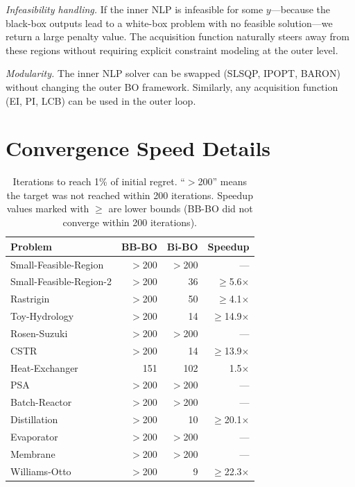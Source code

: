 \documentclass[12pt,a4paper]{article}%
\theoremstyle{plain}%
\theoremstyle{remark}%
\theoremstyle{definition}%
\begin{document}
\begin{appendices}
\emph{Infeasibility handling.} If the inner NLP is infeasible for some $y$---because the black-box outputs lead to a white-box problem with no feasible solution---we return a large penalty value. The acquisition function naturally steers away from these regions without requiring explicit constraint modeling at the outer level.

\emph{Modularity.} The inner NLP solver can be swapped (SLSQP, IPOPT, BARON) without changing the outer BO framework. Similarly, any acquisition function (EI, PI, LCB) can be used in the outer loop.

\section{Convergence Speed Details}\label{sec:convergence_speed_details}

\begin{table}[htbp]
\centering
\caption{Iterations to reach 1\% of initial regret. ``$>$200'' means the target was not reached within 200 iterations. Speedup values marked with $\geq$ are lower bounds (BB-BO did not converge within 200 iterations).}
\label{tab:convergence_speed}
\begin{tabular}{@{}lrrr@{}}
\toprule
\textbf{Problem} & \textbf{BB-BO} & \textbf{Bi-BO} & \textbf{Speedup} \\
\midrule
Small-Feasible-Region   & $>$200 & $>$200 & ---       \\
Small-Feasible-Region-2 & $>$200 & 36     & $\geq$5.6$\times$  \\
Rastrigin               & $>$200 & 50     & $\geq$4.1$\times$  \\
Toy-Hydrology           & $>$200 & 14     & $\geq$14.9$\times$ \\
Rosen-Suzuki            & $>$200 & $>$200 & ---       \\
CSTR                    & $>$200 & 14     & $\geq$13.9$\times$ \\
Heat-Exchanger          & 151    & 102    & 1.5$\times$  \\
PSA                     & $>$200 & $>$200 & ---       \\
Batch-Reactor           & $>$200 & $>$200 & ---       \\
Distillation            & $>$200 & 10     & $\geq$20.1$\times$ \\
Evaporator              & $>$200 & $>$200 & ---       \\
Membrane                & $>$200 & $>$200 & ---       \\
Williams-Otto           & $>$200 & 9      & $\geq$22.3$\times$ \\
\bottomrule
\end{tabular}
\end{table}


\end{appendices}
\end{document}
